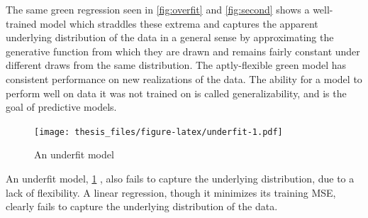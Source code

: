 \documentclass[12pt,twoside]{reedthesis}
\begin{document}
The same green regression seen in \ref{fig:overfit} and \ref{fig:second}
shows a well-trained model which straddles these extrema and captures
the apparent underlying distribution of the data in a general sense by
approximating the generative function from which they are drawn and
remains fairly constant under different draws from the same
distribution. The aptly-flexible green model has consistent performance
on new realizations of the data. The ability for a model to perform well
on data it was not trained on is called generalizability, and is the
goal of predictive models.
\begin{figure}
\centering
\texttt{[image: thesis\_files/figure-latex/underfit-1.pdf]}
\caption{\label{fig:underfit}An underfit model}
\end{figure}
An underfit model, \ref{fig:underfit} , also fails to capture the
underlying distribution, due to a lack of flexibility. A linear
regression, though it minimizes its training MSE, clearly fails to
capture the underlying distribution of the data.
\end{document}
